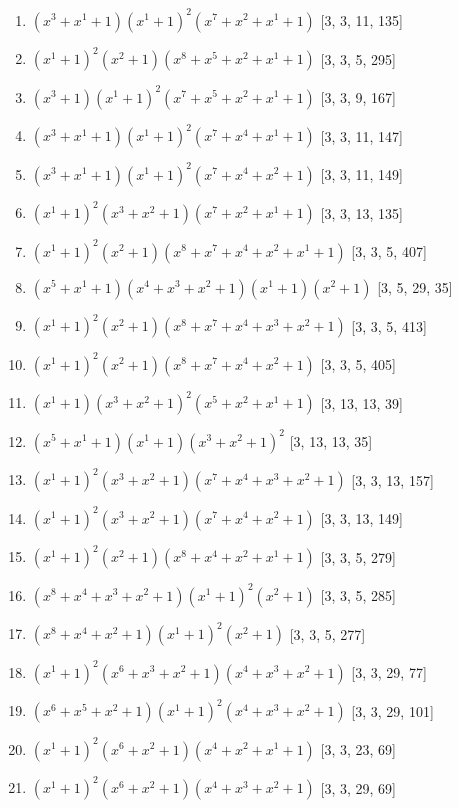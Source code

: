 \documentclass[10pt,twocolumn]{article}
\begin{document}
\begin{enumerate}
\item $(x^{3} + x^{1} + 1)(x^{1} + 1)^{2}(x^{7} + x^{2} + x^{1} + 1)$  [3, 3, 11, 135]
\item $(x^{1} + 1)^{2}(x^{2} + 1)(x^{8} + x^{5} + x^{2} + x^{1} + 1)$  [3, 3, 5, 295]
\item $(x^{3} + 1)(x^{1} + 1)^{2}(x^{7} + x^{5} + x^{2} + x^{1} + 1)$  [3, 3, 9, 167]
\item $(x^{3} + x^{1} + 1)(x^{1} + 1)^{2}(x^{7} + x^{4} + x^{1} + 1)$  [3, 3, 11, 147]
\item $(x^{3} + x^{1} + 1)(x^{1} + 1)^{2}(x^{7} + x^{4} + x^{2} + 1)$  [3, 3, 11, 149]
\item $(x^{1} + 1)^{2}(x^{3} + x^{2} + 1)(x^{7} + x^{2} + x^{1} + 1)$  [3, 3, 13, 135]
\item $(x^{1} + 1)^{2}(x^{2} + 1)(x^{8} + x^{7} + x^{4} + x^{2} + x^{1} + 1)$  [3, 3, 5, 407]
\item $(x^{5} + x^{1} + 1)(x^{4} + x^{3} + x^{2} + 1)(x^{1} + 1)(x^{2} + 1)$  [3, 5, 29, 35]
\item $(x^{1} + 1)^{2}(x^{2} + 1)(x^{8} + x^{7} + x^{4} + x^{3} + x^{2} + 1)$  [3, 3, 5, 413]
\item $(x^{1} + 1)^{2}(x^{2} + 1)(x^{8} + x^{7} + x^{4} + x^{2} + 1)$  [3, 3, 5, 405]
\item $(x^{1} + 1)(x^{3} + x^{2} + 1)^{2}(x^{5} + x^{2} + x^{1} + 1)$  [3, 13, 13, 39]
\item $(x^{5} + x^{1} + 1)(x^{1} + 1)(x^{3} + x^{2} + 1)^{2}$  [3, 13, 13, 35]
\item $(x^{1} + 1)^{2}(x^{3} + x^{2} + 1)(x^{7} + x^{4} + x^{3} + x^{2} + 1)$  [3, 3, 13, 157]
\item $(x^{1} + 1)^{2}(x^{3} + x^{2} + 1)(x^{7} + x^{4} + x^{2} + 1)$  [3, 3, 13, 149]
\item $(x^{1} + 1)^{2}(x^{2} + 1)(x^{8} + x^{4} + x^{2} + x^{1} + 1)$  [3, 3, 5, 279]
\item $(x^{8} + x^{4} + x^{3} + x^{2} + 1)(x^{1} + 1)^{2}(x^{2} + 1)$  [3, 3, 5, 285]
\item $(x^{8} + x^{4} + x^{2} + 1)(x^{1} + 1)^{2}(x^{2} + 1)$  [3, 3, 5, 277]
\item $(x^{1} + 1)^{2}(x^{6} + x^{3} + x^{2} + 1)(x^{4} + x^{3} + x^{2} + 1)$  [3, 3, 29, 77]
\item $(x^{6} + x^{5} + x^{2} + 1)(x^{1} + 1)^{2}(x^{4} + x^{3} + x^{2} + 1)$  [3, 3, 29, 101]
\item $(x^{1} + 1)^{2}(x^{6} + x^{2} + 1)(x^{4} + x^{2} + x^{1} + 1)$  [3, 3, 23, 69]
\item $(x^{1} + 1)^{2}(x^{6} + x^{2} + 1)(x^{4} + x^{3} + x^{2} + 1)$  [3, 3, 29, 69]

\end{enumerate}
\end{document}

